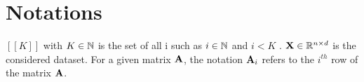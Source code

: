 \section{Notations}

$[\![K]\!]$ with $K \in {\mathbb{N}}$ is the set of all i such as $i \in {\mathbb{N}}$ and $i < K$ . ${\mathbf{X}} \in \mathbb{R}^{n \times d}$ is the considered dataset. For a given matrix ${\mathbf{A}}$, the notation ${\mathbf{A}}_i$ refers to the $i^{th}$ row of the matrix ${\mathbf{A}}$.
